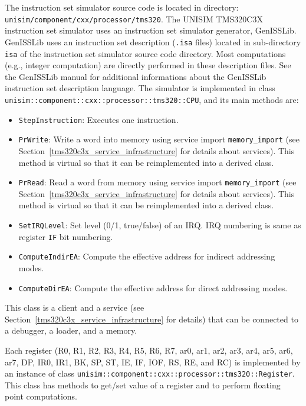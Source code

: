 The instruction set simulator source code is located in directory: \newline \texttt{unisim/component/cxx/processor/tms320}.\newline
The UNISIM TMS320C3X instruction set simulator uses an instruction set simulator generator, GenISSLib.
GenISSLib uses an instruction set description (\texttt{.isa} files) located in sub-directory \texttt{isa} of the instruction set simulator source code directory.
Most computations (e.g., integer computation) are directly performed in these description files.
See the GenISSLib manual for additional informations about the GenISSLib instruction set description language.
The simulator is implemented in class \texttt{unisim::component::cxx::processor::tms320::CPU}, and its main methods are:
\begin{itemize}
\item \texttt{StepInstruction}: Executes one instruction.
\item \texttt{PrWrite}: Write a word into memory using service import \texttt{memory\_import} (see Section~\ref{tms320c3x_service_infrastructure} for details about services). This method is virtual so that it can be reimplemented into a derived class.
\item \texttt{PrRead}: Read a word from memory using service import \texttt{memory\_import} (see Section~\ref{tms320c3x_service_infrastructure} for details about services). This method is virtual so that it can be reimplemented into a derived class.
\item \texttt{SetIRQLevel}: Set level (0/1, true/false) of an IRQ. IRQ numbering is same as register \texttt{IF} bit numbering.
\item \texttt{ComputeIndirEA}: Compute the effective address for indirect addressing modes.
\item \texttt{ComputeDirEA}: Compute the effective address for direct addressing modes.
\end{itemize}
This class is a client and a service (see Section~\ref{tms320c3x_service_infrastructure} for details) that can be connected to a debugger, a loader, and a memory.

Each register (R0, R1, R2, R3, R4, R5, R6, R7, ar0, ar1, ar2, ar3, ar4, ar5, ar6, ar7, DP, IR0, IR1, BK, SP, ST, IE, IF, IOF, RS, RE, and RC) is implemented by an instance of class \texttt{unisim::component::cxx::processor::tms320::Register}.
This class has methods to get/set value of a register and to perform floating point computations.

